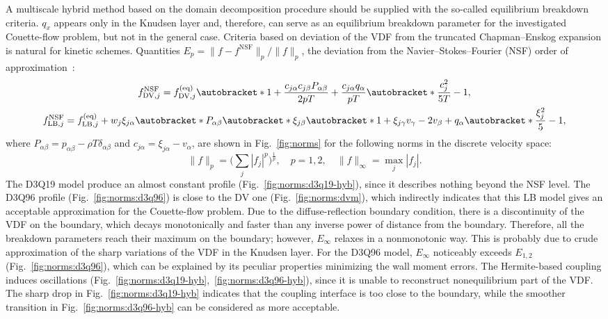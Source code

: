 \documentclass{elsarticle} %
\DeclarePairedDelimiter\autobracket()       %
\newcommand{\br}[1]{\autobracket*{#1}}
\newcommand{\equil}[1]{#1^\mathrm{(eq)}}
\newcommand{\LB}{\mathrm{LB}}
\newcommand{\DV}{\mathrm{DV}}
\newcommand{\xiai}{\xi_{j \alpha}}
\newcommand{\xiaj}{\xi_{j \beta}}
\newcommand{\xiak}{\xi_{j \gamma}}
\newcommand{\cai}{c_{j \alpha}}
\newcommand{\caj}{c_{j \beta}}
\begin{document}
A multiscale hybrid method based on the domain decomposition procedure should be supplied with the so-called equilibrium breakdown criteria.
\(q_x\) appears only in the Knudsen layer and, therefore, can serve as an equilibrium breakdown parameter
for the investigated Couette-flow problem, but not in the general case.
Criteria based on deviation of the VDF from the truncated Chapman--Enskog expansion is natural for kinetic schemes.
Quantities \(E_p=\|f-f^{\mathrm{NSF}}\|_p/\|f\|_p\), the deviation from the Navier--Stokes--Fourier (NSF) order of approximation~\cite{Zhang2014}:
\begin{gather}
    f^{\mathrm{NSF}}_{\DV,j} = \equil{f}_{\DV,j}\br{
        1 + \frac{\cai\caj P_{\alpha\beta}}{2pT} + \frac{\cai q_\alpha}{pT}\br{ \frac{c_j^2}{5T} - 1 } }, \label{eq:NSF_DV} \\
    f^{\mathrm{NSF}}_{\LB,j} = \equil{f}_{\LB,j} + w_j\xiai\br{
         P_{\alpha\beta}\br{\xiaj\br{1 + \xiak v_\gamma} - 2 v_\beta } + q_\alpha\br{ \frac{\xi_j^2}5 - 1 } }, \label{eq:NSF_LB}
\end{gather}
where \(P_{\alpha\beta} = p_{\alpha\beta} - \rho T\delta_{\alpha\beta}\) and \(\cai = \xiai - v_\alpha\),
are shown in Fig.~\ref{fig:norms} for the following norms in the discrete velocity space:
\begin{equation}\label{eq:norms}
    \|f\|_p = \bigg(\sum_j |f_j|^p \bigg)^\frac1p, \quad p=1,2, \quad \|f\|_\infty = \max_j |f_j|.
\end{equation}
The D3Q19 model produce an almost constant profile (Fig.~\ref{fig:norms:d3q19-hyb}),
since it describes nothing beyond the NSF level.
The D3Q96 profile (Fig.~\ref{fig:norms:d3q96}) is close to the DV one (Fig.~\ref{fig:norms:dvm}),
which indirectly indicates that this LB model gives an acceptable approximation for the Couette-flow problem.
Due to the diffuse-reflection boundary condition, there is a discontinuity of the VDF on the boundary,
which decays monotonically and faster than any inverse power of distance from the boundary.
Therefore, all the breakdown parameters reach their maximum on the boundary;
however, \(E_\infty\) relaxes in a nonmonotonic way.
This is probably due to crude approximation of the sharp variations of the VDF in the Knudsen layer.
For the D3Q96 model, \(E_\infty\) noticeably exceeds \(E_{1,2}\) (Fig.~\ref{fig:norms:d3q96}),
which can be explained by its peculiar properties minimizing the wall moment errors.
The Hermite-based coupling induces oscillations (Fig.~\ref{fig:norms:d3q19-hyb},~\ref{fig:norms:d3q96-hyb}),
since it is unable to reconstruct nonequilibrium part of the VDF.
The sharp drop in Fig.~\ref{fig:norms:d3q19-hyb} indicates that the coupling interface is too close to the boundary,
while the smoother transition in Fig.~\ref{fig:norms:d3q96-hyb} can be considered as more acceptable.
\end{document}
